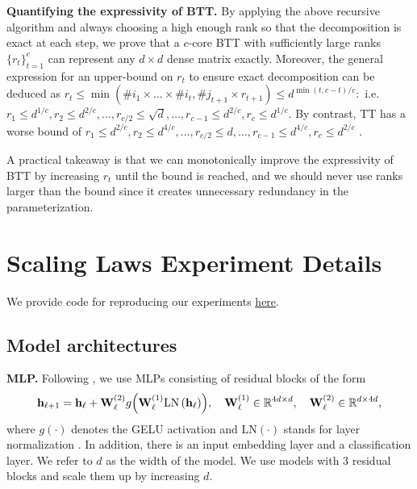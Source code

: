 \documentclass{article}
\newcommand{\mbf}[1]{{\boldsymbol{\mathbf{#1}}}}
\newcommand{\bm}{\mbf}
\theoremstyle{plain}
\theoremstyle{definition}
\theoremstyle{remark}
\newcommand{\R}{\mathbb{R}}
\begin{document}
\noindent \textbf{Quantifying the expressivity of BTT.} \quad
By applying the above recursive algorithm and always choosing a high enough rank so that the decomposition is exact at each step, we prove that a $c$-core BTT with sufficiently large ranks $\{r_t\}_{t=1}^{c}$ can represent any $d\times d$ dense matrix exactly. Moreover, the general expression for an upper-bound on $r_t$ to ensure exact decomposition can be deduced as $r_t \leq \min(\# i_1 \times \ldots \times \# i_t, \# j_{t+1} \times r_{t+1}) \leq d^{\min(t, c-t)/c}:$ i.e. $r_1 \leq d^{1/c}, r_2 \leq d^{2/c}, \ldots, r_{c/2} \leq \sqrt{d}, \ldots, r_{c-1} \leq d^{2/c}, r_c \leq d^{1/c}.$
By contrast, TT has a worse bound of $r_1 \leq d^{2/c}, r_2 \leq d^{4/c}, \ldots, r_{c/2} \leq d, \ldots, r_{c-1} \leq d^{4/c}, r_c \leq d^{2/c}$ \citep{oseledets2011tt}.

A practical takeaway is that we can monotonically improve the expressivity of BTT by increasing $r_t$ until the bound is reached, and we should never use ranks larger than the bound since it creates unnecessary redundancy in the parameterization.



\section{Scaling Laws Experiment Details} \label{app:exp-details}
We provide code for reproducing our experiments \href{https://github.com/shikaiqiu/compute-better-spent}{\underline{here}}.
\subsection{Model architectures} \label{app:arch}
\noindent \textbf{MLP.} \quad
Following \citet{bachmann2023scaling}, we use MLPs consisting of residual blocks of the form
\begin{equation}
      \bm{h}_{\ell+1}
      =
      \bm{h}_{\ell} + \bm{W}_{\ell}^{(2)}g\qty(\bm{W}_{\ell}^{(1)} \text{LN}\left(\bm{h}_{\ell}\right)), \quad \bm{W}_{\ell}^{(1)} \in \R^{4d \times d}, \quad \bm{W}_{\ell}^{(2)} \in \R^{d \times 4d},
\end{equation}
where $g\left(\cdot\right)$ denotes the GELU activation \citep{hendrycks2016gelu}
and $\text{LN}\left(\cdot\right)$ stands for layer normalization \citep{ba2016ln}. In addition, there is an input embedding layer and a classification layer. We refer to $d$ as the width of the model. We use models with $3$ residual blocks and scale them up by increasing $d.$
\end{document}
